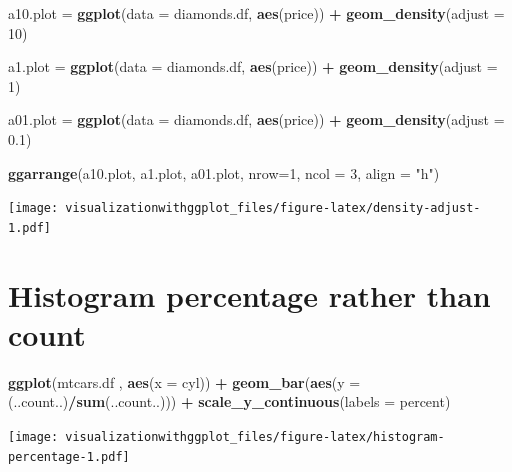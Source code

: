 \documentclass[]{krantz}
\makeatletter
\newenvironment{Shaded}{\begin{snugshade}}{\end{snugshade}}
\newcommand{\KeywordTok}[1]{\textcolor[rgb]{0.13,0.29,0.53}{\textbf{#1}}}
\newcommand{\DataTypeTok}[1]{\textcolor[rgb]{0.13,0.29,0.53}{#1}}
\newcommand{\DecValTok}[1]{\textcolor[rgb]{0.00,0.00,0.81}{#1}}
\newcommand{\FloatTok}[1]{\textcolor[rgb]{0.00,0.00,0.81}{#1}}
\newcommand{\StringTok}[1]{\textcolor[rgb]{0.31,0.60,0.02}{#1}}
\newcommand{\OperatorTok}[1]{\textcolor[rgb]{0.81,0.36,0.00}{\textbf{#1}}}
\newcommand{\NormalTok}[1]{#1}
\newenvironment{kframe}{%
\medskip{}
\setlength{\fboxsep}{.8em}
 \def\at@end@of@kframe{}%
 \ifinner\ifhmode%
  \def\at@end@of@kframe{\end{minipage}}%
  \begin{minipage}{\columnwidth}%
 \fi\fi%
 \def\FrameCommand##1{\hskip\@totalleftmargin \hskip-\fboxsep
 \colorbox{shadecolor}{##1}\hskip-\fboxsep
     \hskip-\linewidth \hskip-\@totalleftmargin \hskip\columnwidth}%
 \MakeFramed {\advance\hsize-\width
   \@totalleftmargin\z@ \linewidth\hsize
   \@setminipage}}%
 {\par\unskip\endMakeFramed%
 \at@end@of@kframe}
\renewenvironment{Shaded}{\begin{kframe}}{\end{kframe}}
\theoremstyle{definition}
\theoremstyle{definition}
\theoremstyle{definition}
\theoremstyle{remark}
\makeatother
\begin{document}
\begin{Shaded}
\begin{Highlighting}[]
\NormalTok{a10.plot =}\StringTok{ }\KeywordTok{ggplot}\NormalTok{(}\DataTypeTok{data =}\NormalTok{ diamonds.df, }\KeywordTok{aes}\NormalTok{(price)) }\OperatorTok{+}\StringTok{ }
\StringTok{  }\KeywordTok{geom_density}\NormalTok{(}\DataTypeTok{adjust =} \DecValTok{10}\NormalTok{) }

\NormalTok{a1.plot =}\StringTok{ }\KeywordTok{ggplot}\NormalTok{(}\DataTypeTok{data =}\NormalTok{ diamonds.df, }\KeywordTok{aes}\NormalTok{(price)) }\OperatorTok{+}\StringTok{ }
\StringTok{  }\KeywordTok{geom_density}\NormalTok{(}\DataTypeTok{adjust =} \DecValTok{1}\NormalTok{) }

\NormalTok{a01.plot =}\StringTok{ }\KeywordTok{ggplot}\NormalTok{(}\DataTypeTok{data =}\NormalTok{ diamonds.df, }\KeywordTok{aes}\NormalTok{(price)) }\OperatorTok{+}\StringTok{ }
\StringTok{  }\KeywordTok{geom_density}\NormalTok{(}\DataTypeTok{adjust  =} \FloatTok{0.1}\NormalTok{) }

\KeywordTok{ggarrange}\NormalTok{(a10.plot, a1.plot, a01.plot,}
    \DataTypeTok{nrow=}\DecValTok{1}\NormalTok{, }\DataTypeTok{ncol =} \DecValTok{3}\NormalTok{, }\DataTypeTok{align =} \StringTok{"h"}\NormalTok{)}
\end{Highlighting}
\end{Shaded}

\texttt{[image: visualizationwithggplot\_files/figure-latex/density-adjust-1.pdf]}

\section{Histogram percentage rather than
count}\label{histogram-percentage-rather-than-count}

\begin{Shaded}
\begin{Highlighting}[]
\KeywordTok{ggplot}\NormalTok{(mtcars.df , }\KeywordTok{aes}\NormalTok{(}\DataTypeTok{x =}\NormalTok{ cyl)) }\OperatorTok{+}\StringTok{ }
\StringTok{    }\KeywordTok{geom_bar}\NormalTok{(}\KeywordTok{aes}\NormalTok{(}\DataTypeTok{y =}\NormalTok{ (..count..)}\OperatorTok{/}\KeywordTok{sum}\NormalTok{(..count..))) }\OperatorTok{+}\StringTok{ }
\StringTok{    }\KeywordTok{scale_y_continuous}\NormalTok{(}\DataTypeTok{labels =}\NormalTok{ percent)}
\end{Highlighting}
\end{Shaded}

\texttt{[image: visualizationwithggplot\_files/figure-latex/histogram-percentage-1.pdf]}
\end{document}
